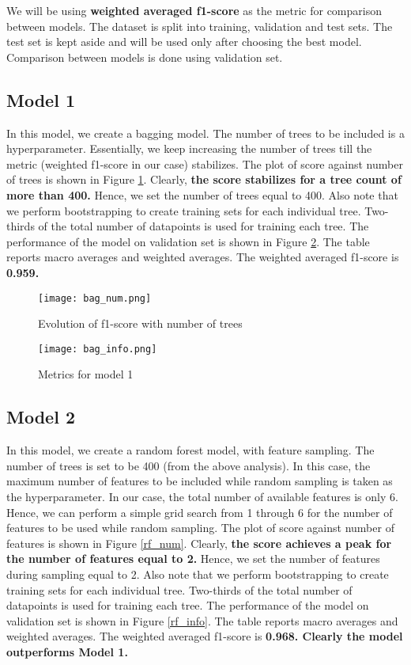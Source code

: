 \documentclass[conference]{IEEEtran}
\begin{document}
We will be using \textbf{weighted averaged f1-score} as the metric for comparison between models. The dataset is split into training, validation and test sets. The test set is kept aside and will be used only after choosing the best model. Comparison between models is done using validation set.

\subsection{Model 1}

In this model, we create a bagging model. The number of trees to be included is a hyperparameter. Essentially, we keep increasing the number of trees till the metric (weighted f1-score in our case) stabilizes. The plot of score against number of trees is shown in Figure \ref{bag_num}. Clearly, \textbf{the score stabilizes for a tree count of more than 400.} Hence, we set the number of trees equal to 400. Also note that we perform bootstrapping to create training sets for each individual tree. Two-thirds of the total number of datapoints is used for training each tree. The performance of the model on validation set is shown in Figure \ref{bag_info}. The table reports macro averages and weighted averages. The weighted averaged f1-score is \textbf{0.959.}

\begin{figure}[tbh]
\centering
\texttt{[image: bag\_num.png]}
\caption{Evolution of f1-score with number of trees}
\label{bag_num}
\end{figure}

\begin{figure}[tbh]
\centering
\texttt{[image: bag\_info.png]}
\caption{Metrics for model 1 }
\label{bag_info}
\end{figure}



\subsection{Model 2}

In this model, we create a random forest model, with feature sampling. The number of trees is set to be 400 (from the above analysis). In this case, the maximum number of features to be included while random sampling is taken as the hyperparameter. In our case, the total number of available features is only 6. Hence, we can perform a simple grid search from 1 through 6 for the number of features to be used while random sampling. The plot of score against number of features is shown in Figure \ref{rf_num}. Clearly, \textbf{the score achieves a peak for the number of features equal to 2.} Hence, we set the number of features during sampling equal to 2. Also note that we perform bootstrapping to create training sets for each individual tree. Two-thirds of the total number of datapoints is used for training each tree. The performance of the model on validation set is shown in Figure \ref{rf_info}. The table reports macro averages and weighted averages. The weighted averaged f1-score is \textbf{0.968. Clearly the model outperforms Model 1.}
\end{document}

